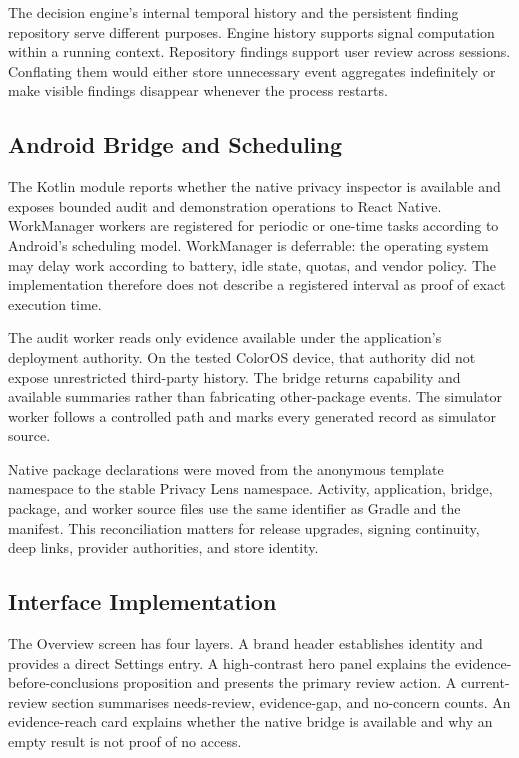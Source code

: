 The decision engine's internal temporal history and the persistent finding repository serve different purposes. Engine history supports signal computation within a running context. Repository findings support user review across sessions. Conflating them would either store unnecessary event aggregates indefinitely or make visible findings disappear whenever the process restarts.

\subsection{Android Bridge and Scheduling}

The Kotlin module reports whether the native privacy inspector is available and exposes bounded audit and demonstration operations to React Native. WorkManager workers are registered for periodic or one-time tasks according to Android's scheduling model. WorkManager is deferrable: the operating system may delay work according to battery, idle state, quotas, and vendor policy. The implementation therefore does not describe a registered interval as proof of exact execution time.

The audit worker reads only evidence available under the application's deployment authority. On the tested ColorOS device, that authority did not expose unrestricted third-party history. The bridge returns capability and available summaries rather than fabricating other-package events. The simulator worker follows a controlled path and marks every generated record as simulator source.

Native package declarations were moved from the anonymous template namespace to the stable Privacy Lens namespace. Activity, application, bridge, package, and worker source files use the same identifier as Gradle and the manifest. This reconciliation matters for release upgrades, signing continuity, deep links, provider authorities, and store identity.

\subsection{Interface Implementation}

The Overview screen has four layers. A brand header establishes identity and provides a direct Settings entry. A high-contrast hero panel explains the evidence-before-conclusions proposition and presents the primary review action. A current-review section summarises needs-review, evidence-gap, and no-concern counts. An evidence-reach card explains whether the native bridge is available and why an empty result is not proof of no access.

